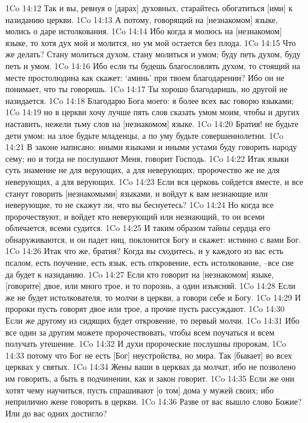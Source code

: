 1Co 14:12  Так и вы, ревнуя о [дарах] духовных, старайтесь обогатиться [ими] к назиданию церкви.
1Co 14:13  А потому, говорящий на [незнакомом] языке, молись о даре истолкования.
1Co 14:14  Ибо когда я молюсь на [незнакомом] языке, то хотя дух мой и молится, но ум мой остается без плода.
1Co 14:15  Что же делать? Стану молиться духом, стану молиться и умом; буду петь духом, буду петь и умом.
1Co 14:16  Ибо если ты будешь благословлять духом, то стоящий на месте простолюдина как скажет: `аминь' при твоем благодарении? Ибо он не понимает, что ты говоришь.
1Co 14:17  Ты хорошо благодаришь, но другой не назидается.
1Co 14:18  Благодарю Бога моего: я более всех вас говорю языками;
1Co 14:19  но в церкви хочу лучше пять слов сказать умом моим, чтобы и других наставить, нежели тьму слов на [незнакомом] языке.
1Co 14:20  Братия! не будьте дети умом: на злое будьте младенцы, а по уму будьте совершеннолетни.
1Co 14:21  В законе написано: иными языками и иными устами буду говорить народу сему; но и тогда не послушают Меня, говорит Господь.
1Co 14:22  Итак языки суть знамение не для верующих, а для неверующих; пророчество же не для неверующих, а для верующих.
1Co 14:23  Если вся церковь сойдется вместе, и все станут говорить [незнакомыми] языками, и войдут к вам незнающие или неверующие, то не скажут ли, что вы беснуетесь?
1Co 14:24  Но когда все пророчествуют, и войдет кто неверующий или незнающий, то он всеми обличается, всеми судится.
1Co 14:25  И таким образом тайны сердца его обнаруживаются, и он падет ниц, поклонится Богу и скажет: истинно с вами Бог.
1Co 14:26  Итак что же, братия? Когда вы сходитесь, и у каждого из вас есть псалом, есть поучение, есть язык, есть откровение, есть истолкование, --все сие да будет к назиданию.
1Co 14:27  Если кто говорит на [незнакомом] языке, [говорите] двое, или много трое, и то порознь, а один изъясняй.
1Co 14:28  Если же не будет истолкователя, то молчи в церкви, а говори себе и Богу.
1Co 14:29  И пророки пусть говорят двое или трое, а прочие пусть рассуждают.
1Co 14:30  Если же другому из сидящих будет откровение, то первый молчи.
1Co 14:31  Ибо все один за другим можете пророчествовать, чтобы всем поучаться и всем получать утешение.
1Co 14:32  И духи пророческие послушны пророкам,
1Co 14:33  потому что Бог не есть [Бог] неустройства, но мира. Так [бывает] во всех церквах у святых.
1Co 14:34  Жены ваши в церквах да молчат, ибо не позволено им говорить, а быть в подчинении, как и закон говорит.
1Co 14:35  Если же они хотят чему научиться, пусть спрашивают [о том] дома у мужей своих; ибо неприлично жене говорить в церкви.
1Co 14:36  Разве от вас вышло слово Божие? Или до вас одних достигло?
